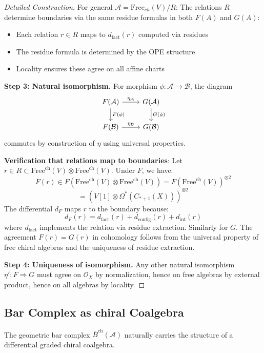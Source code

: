 \begin{proof}[Detailed Construction]
For general $\mathcal{A} = \text{Free}_{ch}(V)/R$:
The relations $R$ determine boundaries via the same residue formulas in both $F(A)$ and $G(A)$:
\begin{itemize}
\item Each relation $r \in R$ maps to $d_{\text{fact}}(r)$ computed via residues
\item The residue formula is determined by the OPE structure
\item Locality ensures these agree on all affine charts
\end{itemize}

\textbf{Step 3: Natural isomorphism.} 
For morphism $\phi: \mathcal{A} \to \mathcal{B}$, the diagram
\[
\begin{tikzcd}
F(\mathcal{A}) \arrow[r, "\eta_\mathcal{A}"] \arrow[d, "F(\phi)"] & G(\mathcal{A}) \arrow[d, "G(\phi)"]\\
F(\mathcal{B}) \arrow[r, "\eta_\mathcal{B}"] & G(\mathcal{B})
\end{tikzcd}
\]
commutes by construction of $\eta$ using universal properties.

\textbf{Verification that relations map to boundaries}: Let $r \in R \subset \text{Free}^{\text{ch}}(V) \otimes \text{Free}^{\text{ch}}(V)$.
Under $F$, we have:
$$F(r) \in F(\text{Free}^{\text{ch}}(V) \otimes \text{Free}^{\text{ch}}(V)) = F(\text{Free}^{\text{ch}}(V))^{\otimes 2}$$
$$ = (V[1] \otimes \Omega^*(C_{*+1}(X)))^{\otimes 2}$$
The differential $d_F$ maps $r$ to the boundary because:
$$d_F(r) = d_{\text{fact}}(r) + d_{\text{config}}(r) + d_{\text{int}}(r)$$
where $d_{\text{fact}}$ implements the relation via residue extraction. Similarly for $G$.
The agreement $F(r) = G(r)$ in cohomology follows from the universal property
of free chiral algebras and the uniqueness of residue extraction.

\textbf{Step 4: Uniqueness of isomorphism.}
Any other natural isomorphism $\eta': F \Rightarrow G$ must agree on $\mathcal{O}_X$ by normalization,
hence on free algebras by external product, hence on all algebras by locality.
\end{proof}

\subsection{Bar Complex as chiral Coalgebra}

\begin{theorem}\label{thm:bar-chiral}
The geometric bar complex $\bar{B}^{\text{ch}}(\mathcal{A})$ naturally carries the structure of a differential graded chiral coalgebra.
\end{theorem}

